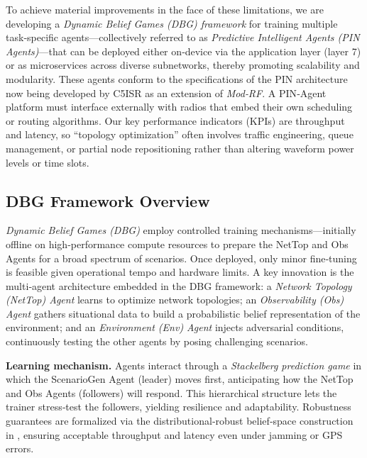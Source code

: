 \documentclass[doc.tex]{subfiles}
\begin{document}
To achieve material improvements in the face of these limitations, we are developing a \emph{Dynamic Belief Games (DBG) framework} for training multiple task‑specific agents—collectively referred to as \emph{Predictive Intelligent Agents (PIN Agents)}—that can be deployed either on‑device via the application layer (layer 7) or as microservices across diverse subnetworks, thereby promoting scalability and modularity. These agents conform to the specifications of the PIN architecture now being developed by C5ISR as an extension of \emph{Mod‑RF}. A PIN‑Agent platform must interface externally with radios that embed their own scheduling or routing algorithms. Our key performance indicators (KPIs) are throughput and latency, so “topology optimization” often involves traffic engineering, queue management, or partial node repositioning rather than altering waveform power levels or time slots.

\subsection{DBG Framework Overview}

\emph{Dynamic Belief Games (DBG)} employ controlled training mechanisms—initially offline on high‑performance compute resources to prepare the NetTop and Obs Agents for a broad spectrum of scenarios. Once deployed, only minor fine‑tuning is feasible given operational tempo and hardware limits. A key innovation is the multi‑agent architecture embedded in the DBG framework: a \emph{Network Topology (NetTop) Agent} learns to optimize network topologies; an \emph{Observability (Obs) Agent} gathers situational data to build a probabilistic belief representation of the environment; and an \emph{Environment (Env) Agent} injects adversarial conditions, continuously testing the other agents by posing challenging scenarios.

\textbf{Learning mechanism.} Agents interact through a \emph{Stackelberg prediction game} in which the ScenarioGen Agent (leader) moves first, anticipating how the NetTop and Obs Agents (followers) will respond. This hierarchical structure lets the trainer stress‑test the followers, yielding resilience and adaptability. Robustness guarantees are formalized via the distributional‑robust belief‑space construction in \cite{bovy2024robust}, ensuring acceptable throughput and latency even under jamming or GPS errors.
\end{document}
